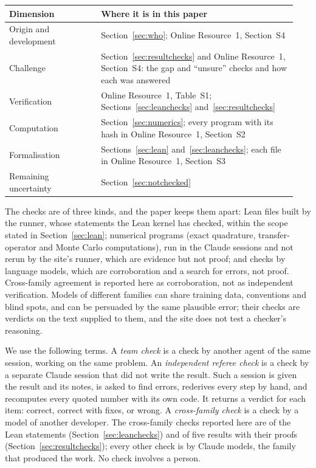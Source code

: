\begin{center}
\begin{tabular}{@{}p{0.3\linewidth}p{0.64\linewidth}@{}}
\hline
Dimension & Where it is in this paper\\
\hline
Origin and development & Section~\ref{sec:who}; Online Resource~1, Section~S4\\
Challenge & Section~\ref{sec:resultchecks} and Online Resource~1, Section~S4: the gap and ``unsure'' checks and how each was answered\\
Verification & Online Resource~1, Table~S1; Sections~\ref{sec:leanchecks} and~\ref{sec:resultchecks}\\
Computation & Section~\ref{sec:numerics}; every program with its hash in Online Resource~1, Section~S2\\
Formalisation & Sections~\ref{sec:lean} and~\ref{sec:leanchecks}; each file in Online Resource~1, Section~S3\\
Remaining uncertainty & Section~\ref{sec:notchecked}\\
\hline
\end{tabular}
\end{center}

The checks are of three kinds, and the paper keeps them apart: Lean files built by the runner, whose statements the Lean kernel has checked, within the scope stated in Section~\ref{sec:lean}; numerical programs (exact quadrature, transfer-operator and Monte Carlo computations), run in the Claude sessions and not rerun by the site's runner, which are evidence but not proof; and checks by language models, which are corroboration and a search for errors, not proof. Cross-family agreement is reported here as corroboration, not as independent verification. Models of different families can share training data, conventions and blind spots, and can be persuaded by the same plausible error; their checks are verdicts on the text supplied to them, and the site does not test a checker's reasoning.

We use the following terms. A \emph{team check} is a check by another agent of the same session, working on the same problem. An \emph{independent referee check} is a check by a separate Claude session that did not write the result. Such a session is given the result and its notes, is asked to find errors, rederives every step by hand, and recomputes every quoted number with its own code. It returns a verdict for each item: correct, correct with fixes, or wrong. A \emph{cross-family check} is a check by a model of another developer. The cross-family checks reported here are of the Lean statements (Section~\ref{sec:leanchecks}) and of five results with their proofs (Section~\ref{sec:resultchecks}); every other check is by Claude models, the family that produced the work. No check involves a person.


